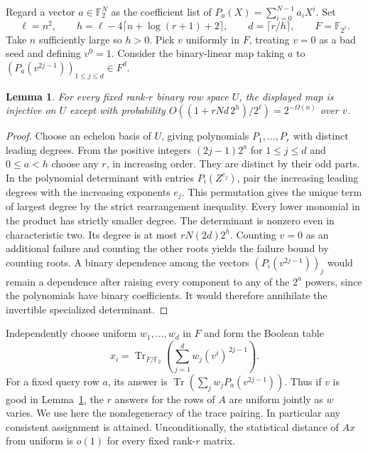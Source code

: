 \documentclass[11pt]{article}
\newtheorem{lemma}[theorem]{Lemma}
\newcommand{\F}{\mathbb F_2}
\newcommand{\Tr}{\operatorname{Tr}}
\begin{document}
Regard a vector $a\in\F^N$ as the coefficient list of $P_a(X)=\sum_{i=0}^{N-1}a_iX^i$. Set
\[
 \ell=n^2,\qquad h=\ell-4\lceil n+\log(r+1)+2\rceil,
 \qquad d=\lceil r/h\rceil,\qquad F=\mathbb F_{2^\ell}.
\]
Take $n$ sufficiently large so $h>0$. Pick $v$ uniformly in $F$, treating $v=0$ as a bad seed and defining $v^0=1$. Consider the binary-linear map taking $a$ to $(P_a(v^{2j-1}))_{1\le j\le d}\in F^d$.
\begin{lemma}\label{lem:rank}
For every fixed rank-$r$ binary row space $U$, the displayed map is injective on $U$ except with probability $O((1+rNd\,2^h)/2^\ell)=2^{-\Omega(n)}$ over $v$.
\end{lemma}
\begin{proof}
Choose an echelon basis of $U$, giving polynomials $P_1,\ldots,P_r$ with distinct leading degrees. From the positive integers $(2j-1)2^a$ for $1\le j\le d$ and $0\le a<h$ choose any $r$, in increasing order. They are distinct by their odd parts. In the polynomial determinant with entries $P_i(Z^{e_j})$, pair the increasing leading degrees with the increasing exponents $e_j$. This permutation gives the unique term of largest degree by the strict rearrangement inequality. Every lower monomial in the product has strictly smaller degree. The determinant is nonzero even in characteristic two. Its degree is at most $rN(2d)2^h$. Counting $v=0$ as an additional failure and counting the other roots yields the failure bound by counting roots. A binary dependence among the vectors $(P_i(v^{2j-1}))_j$ would remain a dependence after raising every component to any of the $2^a$ powers, since the polynomials have binary coefficients. It would therefore annihilate the invertible specialized determinant.
\end{proof}

Independently choose uniform $w_1,\ldots,w_d$ in $F$ and form the Boolean table
\[
 x_i=\Tr_{F/\F}\!\left(\sum_{j=1}^d w_j(v^i)^{\,2j-1}\right).
\]
For a fixed query row $a$, its answer is $\Tr(\sum_j w_j P_a(v^{2j-1}))$. Thus if $v$ is good in Lemma~\ref{lem:rank}, the $r$ answers for the rows of $A$ are uniform jointly as $w$ varies. We use here the nondegeneracy of the trace pairing. In particular any consistent assignment is attained. Unconditionally, the statistical distance of $Ax$ from uniform is $o(1)$ for every fixed rank-$r$ matrix.
\end{document}
